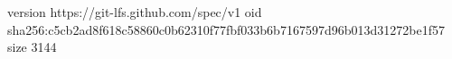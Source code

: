 version https://git-lfs.github.com/spec/v1
oid sha256:c5cb2ad8f618c58860c0b62310f77fbf033b6b7167597d96b013d31272be1f57
size 3144
